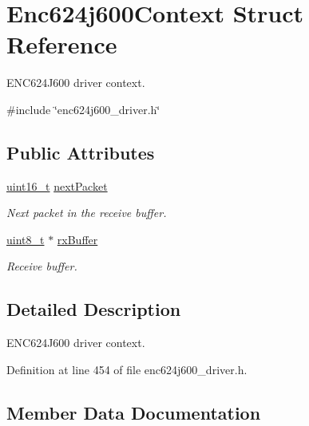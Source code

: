 \hypertarget{structEnc624j600Context}{}\section{Enc624j600\+Context Struct Reference}
\label{structEnc624j600Context}


E\+N\+C624\+J600 driver context.  




{\ttfamily \#include \char`\"{}enc624j600\+\_\+driver.\+h\char`\"{}}

\subsection*{Public Attributes}
\begin{DoxyCompactItemize}
\item 
\hyperlink{stdint_8h_a273cf69d639a59973b6019625df33e30}{uint16\+\_\+t} \hyperlink{structEnc624j600Context_a6167e33bcd67d0631bc49a1761921160}{next\+Packet}
\begin{DoxyCompactList}\small\item\em Next packet in the receive buffer. \end{DoxyCompactList}\item 
\hyperlink{stdint_8h_aba7bc1797add20fe3efdf37ced1182c5}{uint8\+\_\+t} $\ast$ \hyperlink{structEnc624j600Context_a305c1bc66c5b374d8fa7ce52bdcb3b73}{rx\+Buffer}
\begin{DoxyCompactList}\small\item\em Receive buffer. \end{DoxyCompactList}\end{DoxyCompactItemize}


\subsection{Detailed Description}
E\+N\+C624\+J600 driver context. 

Definition at line 454 of file enc624j600\+\_\+driver.\+h.



\subsection{Member Data Documentation}
\mbox{\label{structEnc624j600Context_a6167e33bcd67d0631bc49a1761921160}} 
